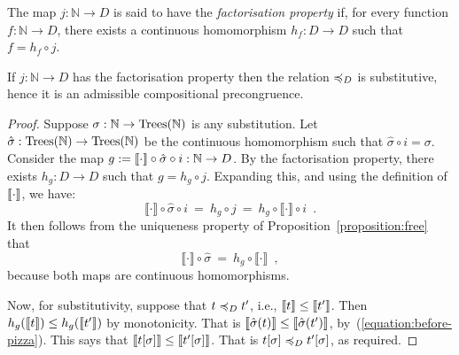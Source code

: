 \begin{definition}
    The map $j\colon \mathbb{N} \to D$ is said to have  the \emph{factorisation property} if,
    for every function $f \colon \mathbb{N} \to D$, there exists a 
    continuous homomorphism $h_{\!f} : D \to D$ such that $f = h_{\!f} \circ j$.
    \begin{center}
    \end{center}
\end{definition}
\begin{proposition}
If $j\colon \mathbb{N} \to D$ has the factorisation property then 
the relation $\preccurlyeq_D$ is substitutive, hence it is an admissible compositional precongruence.
\end{proposition}

\begin{proof}
Suppose $\sigma: \mathbb{N} \to \textnormal{Trees}(\mathbb{N})$ is any  substitution.
Let $\hat{\sigma} : \textnormal{Trees}(\mathbb{N}) \to \textnormal{Trees}(\mathbb{N})$ be the continuous homomorphism
such that $\hat{\sigma} \circ i = \sigma$. Consider the map $g := \llbracket \cdot \rrbracket \circ \hat{\sigma} \circ i : \mathbb{N} \to D$. By the factorisation property, there exists $h_g : D \to D$ such that
$g = h_g \circ j$. Expanding this, and using the definition of $\llbracket \cdot \rrbracket$, we have:
\[
 \llbracket \cdot \rrbracket \circ \hat{\sigma} \circ i ~ = ~ h_g \circ j ~ = ~  h_g \circ  \llbracket \cdot \rrbracket \circ i \enspace .
\]
It then follows from  the uniqueness property of Proposition~\ref{proposition:free} that
\begin{equation}
\label{equation:before-pizza}
\llbracket \cdot \rrbracket \circ \hat{\sigma} ~ = ~ h_g \circ  \llbracket \cdot \rrbracket \enspace ,
\end{equation}
because both maps are continuous homomorphisms.

Now, for substitutivity, suppose  that $t \preccurlyeq_D t'$, i.e., $\llbracket t \rrbracket \leq \llbracket t' \rrbracket$. Then 
$h_g (\llbracket t \rrbracket)  \leq h_g(\llbracket t' \rrbracket)$ by monotonicity. That is
$\llbracket  \hat{\sigma}(t) \rrbracket \leq \llbracket  \hat{\sigma}(t') \rrbracket$, by~(\ref{equation:before-pizza}). 
This says that $\llbracket  t[\sigma] \rrbracket \leq \llbracket t'[\sigma] \rrbracket$. That is
$t[\sigma] \preccurlyeq_D t'[\sigma]$, as required.
\end{proof}

